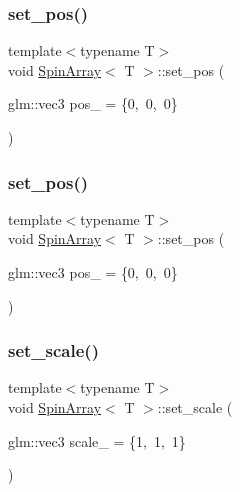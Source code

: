 \mbox{\label{classSpinArray_a904e68a8b76d7da16140a0352ae04dfa}} 
\subsubsection{\texorpdfstring{set\+\_\+pos()}{set\_pos()}\hspace{0.1cm}{\footnotesize\ttfamily [3/4]}}
{\footnotesize\ttfamily template$<$typename T$>$ \\
void \mbox{\hyperlink{classSpinArray}{Spin\+Array}}$<$ T $>$\+::set\+\_\+pos (\begin{DoxyParamCaption}\item[{glm\+::vec3}]{pos\+\_\+ = {\ttfamily \{0,~0,~0\}} }\end{DoxyParamCaption})\hspace{0.3cm}{\ttfamily [inline]}}

\mbox{\label{classSpinArray_a904e68a8b76d7da16140a0352ae04dfa}} 
\subsubsection{\texorpdfstring{set\+\_\+pos()}{set\_pos()}\hspace{0.1cm}{\footnotesize\ttfamily [4/4]}}
{\footnotesize\ttfamily template$<$typename T$>$ \\
void \mbox{\hyperlink{classSpinArray}{Spin\+Array}}$<$ T $>$\+::set\+\_\+pos (\begin{DoxyParamCaption}\item[{glm\+::vec3}]{pos\+\_\+ = {\ttfamily \{0,~0,~0\}} }\end{DoxyParamCaption})\hspace{0.3cm}{\ttfamily [inline]}}

\mbox{\label{classSpinArray_acc4dd3d5a680c195ebaea00120bd5ed8}} 
\subsubsection{\texorpdfstring{set\+\_\+scale()}{set\_scale()}\hspace{0.1cm}{\footnotesize\ttfamily [1/4]}}
{\footnotesize\ttfamily template$<$typename T$>$ \\
void \mbox{\hyperlink{classSpinArray}{Spin\+Array}}$<$ T $>$\+::set\+\_\+scale (\begin{DoxyParamCaption}\item[{glm\+::vec3}]{scale\+\_\+ = {\ttfamily \{1,~1,~1\}} }\end{DoxyParamCaption})\hspace{0.3cm}{\ttfamily [inline]}}

